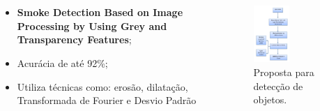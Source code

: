 \documentclass{beamer}
\begin{document}

\section{}

\begin{frame}{}
\begin{columns}
    \begin{column}{0.40\textwidth}
		\begin{itemize}
			\item \textbf{Smoke Detection Based on Image Processing by Using Grey and Transparency Features};
			\item Acurácia de até 92\%;
			\item Utiliza técnicas como: erosão, dilatação, Transformada de Fourier e Desvio Padrão
		\end{itemize}
    \end{column}

    \begin{column}{0.6\textwidth}
		\begin{figure}[H]
		    \centering
		    \begin{center}
		    \includegraphics[width=0.51\textwidth]{img/fig2-artigo9.png}
		  \caption{Proposta para detecção de objetos.}
		    \label{fig:sar}
		  \end{center}
		\end{figure}
    \end{column}
\end{columns}
\end{frame}
\end{document}
